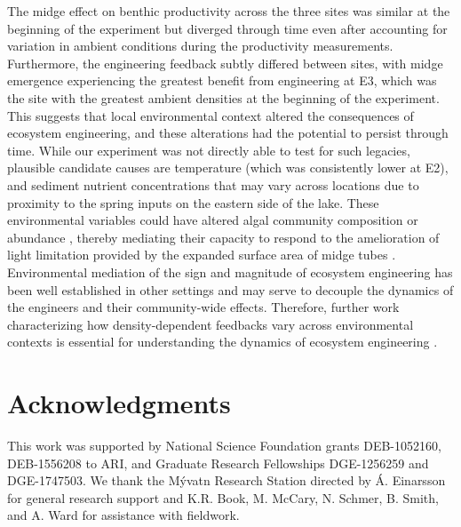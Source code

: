 \documentclass[12pt]{article}
\begin{document}
The midge effect on benthic productivity across the three sites 
was similar at the beginning of the experiment
but diverged through time even after accounting for variation in ambient conditions
during the productivity measurements.
Furthermore, the engineering feedback subtly differed between sites,
with midge emergence experiencing the greatest benefit from engineering at E3,
which was the site with the greatest ambient densities at the beginning of the experiment.
This suggests that local environmental context altered the consequences 
of ecosystem engineering, 
and these alterations had the potential to persist through time.
While our experiment was not directly able to test for such legacies,
plausible candidate causes are temperature (which was consistently lower at E2),
and sediment nutrient concentrations that may vary across locations 
due to proximity to the spring inputs on the eastern side of the lake.
These environmental variables could have altered algal 
community composition or abundance
\citep{mccormick2019},
thereby mediating their capacity to respond to the 
amelioration of light limitation provided 
by the expanded surface area of midge tubes
\citep{phillips2019}.
Environmental mediation of the sign and magnitude of ecosystem engineering 
has been well established in other settings 
\citep{wright2006,lathlean2017}
and may serve to decouple the dynamics of the engineers and their community-wide effects.
Therefore, further work characterizing how density-dependent feedbacks vary across 
environmental contexts is essential for understanding the dynamics of ecosystem engineering
\citep{cuddington2009}.






\section*{Acknowledgments}

This work was supported by National Science Foundation grants 
DEB-1052160, DEB-1556208 to ARI,
and Graduate Research Fellowships DGE-1256259 and DGE-1747503.
We thank the M\'{y}vatn Research Station directed by \'{A}. Einarsson
for general research support and K.R. Book, M. McCary, N. Schmer, B. Smith, and A. Ward
for assistance with fieldwork.
\end{document}
